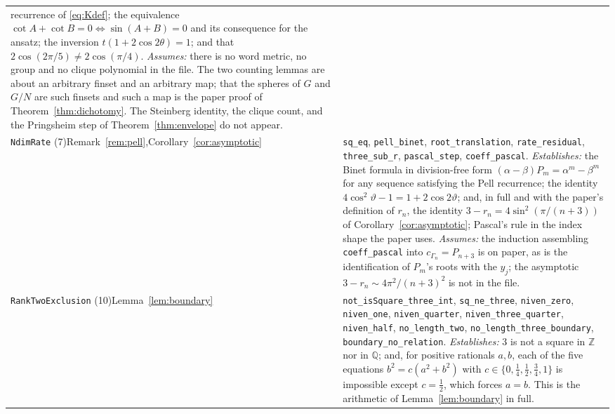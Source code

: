 \documentclass[11pt,a4paper]{article}
\newcommand{\Z}{\mathbb{Z}}
\newcommand{\Q}{\mathbb{Q}}
\theoremstyle{definition}
\theoremstyle{remark}
\theoremstyle{plain}
\begin{document}
\begin{longtable}{@{}p{}p{}@{}}
  recurrence of \eqref{eq:Kdef}; the equivalence $\cot A+\cot B=0\iff\sin(A+B)=0$ and its
  consequence for the ansatz; the inversion $t(1+2\cos2\theta)=1$; and that
  $2\cos(2\pi/5)\ne2\cos(\pi/4)$.\newline
  \emph{Assumes:} there is no word metric, no group and no clique polynomial in the file. The
  two counting lemmas are about an arbitrary finset and an arbitrary map; that the spheres of
  $G$ and $G/N$ are such finsets and such a map is the paper proof of
  Theorem~\ref{thm:dichotomy}. The Steinberg identity, the clique count, and the Pringsheim
  step of Theorem~\ref{thm:envelope} do not appear. \\
\addlinespace
\texttt{NdimRate} (7)\newline Remark~\ref{rem:pell},\newline Corollary~\ref{cor:asymptotic}
& \texttt{sq\_eq}, \texttt{pell\_binet}, \texttt{root\_translation}, \texttt{rate\_residual},
  \texttt{three\_sub\_r}, \texttt{pascal\_step}, \texttt{coeff\_pascal}.\newline
  \emph{Establishes:} the Binet formula in division-free form $(\alpha-\beta)P_m
  =\alpha^m-\beta^m$ for any sequence satisfying the Pell recurrence; the identity
  $4\cos^2\vartheta-1=1+2\cos2\vartheta$; and, in full and with the paper's definition of
  $r_n$, the identity $3-r_n=4\sin^2(\pi/(n+3))$ of Corollary~\ref{cor:asymptotic}; Pascal's
  rule in the index shape the paper uses.\newline
  \emph{Assumes:} the induction assembling \texttt{coeff\_pascal} into
  $c_{\Gamma_n}=P_{n+3}$ is on paper, as is the identification of $P_m$'s roots with the
  $y_j$; the asymptotic $3-r_n\sim4\pi^2/(n+3)^2$ is not in the file. \\
\addlinespace
\texttt{RankTwoExclusion} (10)\newline Lemma~\ref{lem:boundary}
& \texttt{not\_isSquare\_three\_int}, \texttt{sq\_ne\_three}, \texttt{niven\_zero},
  \texttt{niven\_one}, \texttt{niven\_quarter}, \texttt{niven\_three\_quarter},
  \texttt{niven\_half}, \texttt{no\_length\_two}, \texttt{no\_length\_three\_boundary},
  \texttt{boundary\_no\_relation}.\newline
  \emph{Establishes:} $3$ is not a square in $\Z$ nor in $\Q$; and, for positive rationals
  $a,b$, each of the five equations $b^2=c(a^2+b^2)$ with
  $c\in\{0,\tfrac14,\tfrac12,\tfrac34,1\}$ is impossible except $c=\tfrac12$, which forces
  $a=b$. This is the arithmetic of Lemma~\ref{lem:boundary} in full.\newline

\end{longtable}
\end{document}
